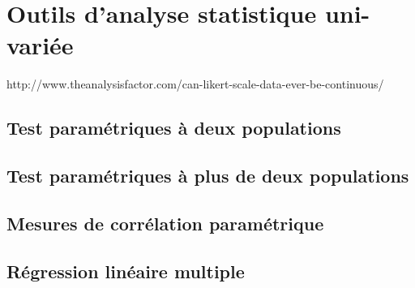 \chapter{Outils d'analyse statistique uni-variée}
\label{app:statuni}

http://www.theanalysisfactor.com/can-likert-scale-data-ever-be-continuous/

\section{Test paramétriques à deux populations}

\section{Test paramétriques à plus de deux populations}
\label{app:anova}

\section{Mesures de corrélation paramétrique}
\label{app:corr}

\section{Régression linéaire multiple}
\label{app:regressionMultiple}
